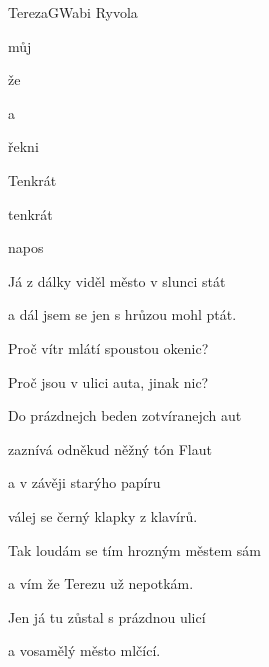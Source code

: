 \begin{song}{Tereza}{G}{Wabi Ryvola}

\begin{SBVerse}


můj 

že 

a 

\end{SBVerse}

\begin{SBChorus}


řekni 

Tenkrát 

tenkrát 

napos

\end{SBChorus}

\begin{SBVerse}

Já z dálky viděl město v slunci stát

a dál jsem se jen s hrůzou mohl ptát.

Proč vítr mlátí spoustou okenic?

Proč jsou v ulici auta, jinak nic?

\end{SBVerse}

\begin{SBVerse}

Do prázdnejch beden zotvíranejch aut

zaznívá odněkud něžný tón Flaut

a v závěji starýho papíru

válej se černý klapky z klavírů.

\end{SBVerse}

\begin{SBVerse}

Tak loudám se tím hrozným městem sám

a vím že Terezu už nepotkám.

Jen já tu zůstal s prázdnou ulicí

a vosamělý město mlčící.

\end{SBVerse}

\end{song}

\pagebreak